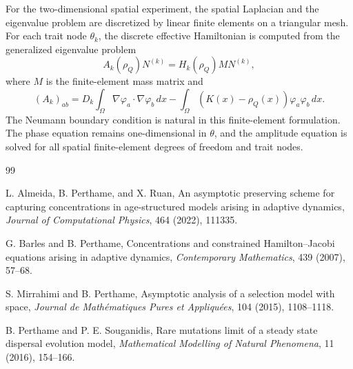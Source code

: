 \documentclass[11pt]{article}
\begin{document}
For the two-dimensional spatial experiment, the spatial Laplacian and the eigenvalue problem are discretized by linear finite elements on a triangular mesh.  For each trait node \(\theta_k\), the discrete effective Hamiltonian is computed from the generalized eigenvalue problem
\begin{equation}\label{eq:fem_H_new}
    A_k(\rho_Q)N^{(k)}=H_k(\rho_Q)M N^{(k)},
\end{equation}
where \(M\) is the finite-element mass matrix and
\begin{equation}\label{eq:fem_A_new}
    (A_k)_{ab}
    =D_k\int_\Omega \nabla\varphi_a\cdot\nabla\varphi_b\,dx
    -\int_\Omega (K(x)-\rho_Q(x))\varphi_a\varphi_b\,dx.
\end{equation}
The Neumann boundary condition is natural in this finite-element formulation.  The phase equation remains one-dimensional in \(\theta\), and the amplitude equation is solved for all spatial finite-element degrees of freedom and trait nodes.


\begin{thebibliography}{99}

L. Almeida, B. Perthame, and X. Ruan,
An asymptotic preserving scheme for capturing concentrations in
age-structured models arising in adaptive dynamics,
\emph{Journal of Computational Physics}, 464 (2022), 111335.

G. Barles and B. Perthame,
Concentrations and constrained Hamilton--Jacobi equations arising in adaptive
dynamics,
\emph{Contemporary Mathematics}, 439 (2007), 57--68.

S. Mirrahimi and B. Perthame,
Asymptotic analysis of a selection model with space,
\emph{Journal de Math\'{e}matiques Pures et Appliqu\'{e}es}, 104 (2015),
1108--1118.

B. Perthame and P. E. Souganidis,
Rare mutations limit of a steady state dispersal evolution model,
\emph{Mathematical Modelling of Natural Phenomena}, 11 (2016), 154--166.

\end{thebibliography}
\end{document}
